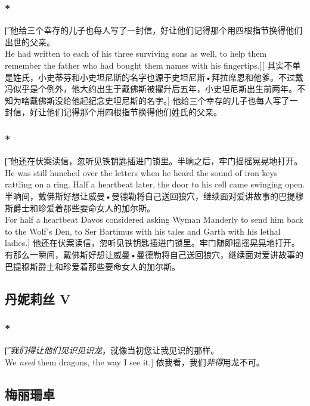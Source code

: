 \documentclass[12pt,a4paper]{article}
\begin{document}
\subsubsection{\color{red}*}\t[
	 他给三个幸存的儿子也每人写了一封信，好让他们记得那个用四根指节换得他们出世的父亲。\\
	 He had written to each of his three surviving sons as well, to help them remember the father who had bought them names with his fingertips.][
	 其实不单是姓氏，小史蒂芬和小史坦尼斯的名字也源于史坦尼斯•拜拉席恩和他爹。不过戴冯似乎是个例外，他大约出生于戴佛斯被擢升后五年，小史坦尼斯出生前两年。不知为啥戴佛斯没给他起纪念史坦尼斯的名字。]
	 他给三个幸存的儿子也每人写了一封信，好让他们记得那个用四根指节换得他们姓氏的父亲。
	 
\subsubsection{\color{red}*}\t[
	他还在伏案读信，忽听见铁钥匙插进门锁里。半晌之后，牢门摇摇晃晃地打开。\\
		He was still hunched over the letters when he heard the sound of iron keys rattling on a ring. Half a heartbeat later, the door to his cell came swinging open.\\
	半晌间，戴佛斯好想让威曼•曼德勒将自己送回狼穴，继续面对爱讲故事的巴提穆斯爵士和珍爱着那些要命女人的加尔斯。\\
		For half a heartbeat Davos considered asking Wyman Manderly to send him back to the Wolf's Den, to Ser Bartimus with his tales and Garth with his lethal ladies.]
	他还在伏案读信，忽听见铁钥匙插进门锁里。牢门随即摇摇晃晃地打开。\\
	有那么一瞬间，戴佛斯好想让威曼•曼德勒将自己送回狼穴，继续面对爱讲故事的巴提穆斯爵士和珍爱着那些要命女人的加尔斯。
	
\subsection{丹妮莉丝 V}
\subsubsection{\color{red}*}\t[
	\emph{我们得让他们见识见识龙}，就像当初您让我见识的那样。\\
	We \emph{need} them dragons, the way I see it.]
	依我看，我们\emph{非得}用龙不可。
	

\subsection{梅丽珊卓}
\end{document}
